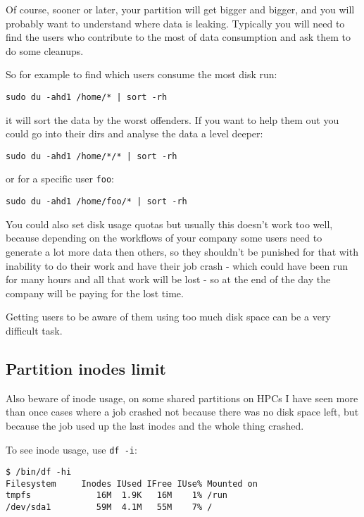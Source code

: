 \documentclass[
]{report}
\begin{document}
Of course, sooner or later, your partition will get bigger and bigger,
and you will probably want to understand where data is leaking.
Typically you will need to find the users who contribute to the most of
data consumption and ask them to do some cleanups.

So for example to find which users consume the most disk run:

\begin{verbatim}
sudo du -ahd1 /home/* | sort -rh
\end{verbatim}

it will sort the data by the worst offenders. If you want to help them
out you could go into their dirs and analyse the data a level deeper:

\begin{verbatim}
sudo du -ahd1 /home/*/* | sort -rh
\end{verbatim}

or for a specific user \texttt{foo}:

\begin{verbatim}
sudo du -ahd1 /home/foo/* | sort -rh
\end{verbatim}

You could also set disk usage quotas but usually this doesn't work too
well, because depending on the workflows of your company some users need
to generate a lot more data then others, so they shouldn't be punished
for that with inability to do their work and have their job crash -
which could have been run for many hours and all that work will be lost
- so at the end of the day the company will be paying for the lost time.

Getting users to be aware of them using too much disk space can be a
very difficult task.

\subsection{Partition inodes limit}\label{partition-inodes-limit}

Also beware of inode usage, on some shared partitions on HPCs I have
seen more than once cases where a job crashed not because there was no
disk space left, but because the job used up the last inodes and the
whole thing crashed.

To see inode usage, use \texttt{df\ -i}:

\begin{verbatim}
$ /bin/df -hi
Filesystem     Inodes IUsed IFree IUse% Mounted on
tmpfs             16M  1.9K   16M    1% /run
/dev/sda1         59M  4.1M   55M    7% /
\end{verbatim}
\end{document}
